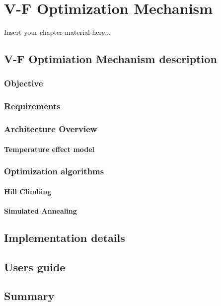 
\chapter{V-F Optimization Mechanism}
\label{chapter:mech}

Insert your chapter material here...


\section{V-F Optimiation Mechanism description}
\label{section:problem}

\subsection{Objective}
\subsection{Requirements}
\subsection{Architecture Overview}
\subsubsection{Temperature effect model}
\subsection{Optimization algorithms}
\subsubsection{Hill Climbing}

\subsubsection{Simulated Annealing}

\section{Implementation details}

\section{Users guide}


\section{Summary}